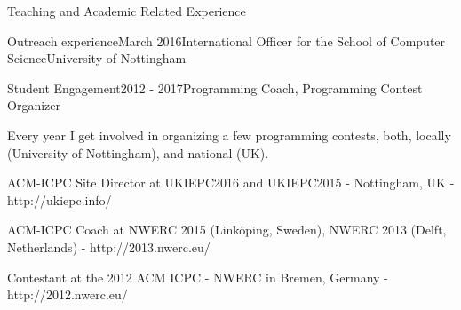 \documentclass{resume} %
\begin{document}
\begin{rSection}{Teaching and Academic Related Experience}
\begin{rSubsection}{Outreach experience}{March 2016}{International Officer for the School of Computer Science}{University of Nottingham}
    \end{rSubsection}
\vspace{-1mm}
    \begin{rSubsection}{Student Engagement}{2012 - 2017}{Programming Coach, Programming Contest Organizer}{}
    	\item Every year I get involved in organizing a few programming contests, both, locally (University of Nottingham), and national (UK).
    	\item  ACM-ICPC Site Director at UKIEPC2016 and UKIEPC2015 - Nottingham, UK - {http://ukiepc.info/}
    	\item  ACM-ICPC Coach at NWERC 2015 (Linköping, Sweden), NWERC 2013 (Delft, Netherlands) - {http://2013.nwerc.eu/} 
    	\item Contestant at the 2012 ACM ICPC - NWERC in Bremen, Germany - {http://2012.nwerc.eu/}
    \end{rSubsection}
\end{rSection}
\vspace{-2 mm}
\end{document}
